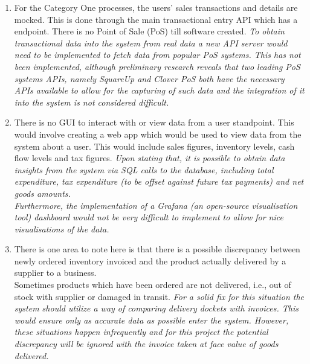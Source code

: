 \begin{enumerate}
	\item For the Category One processes, the users' sales transactions and details are mocked. This is done through the main transactional
	      entry API which has a  endpoint. There is no Point of Sale (PoS) till software created.
	      \bigbreak
	      \emph{To obtain transactional data into the system from real data a new API server would need to be
		      implemented to fetch data from popular PoS systems. This has not been implemented, although
		      preliminary research reveals that two leading PoS systems APIs, namely SquareUp\autocite{SquareSolutionsTools}
		      and Clover PoS \autocite{APIReferenceOverview} both have the necessary APIs available to
		      allow for the capturing of such data and the integration of it into the system is not considered difficult.}
	\item There is no GUI to interact with or view data from a user standpoint. This would involve creating a web app which would be used to view data from the system about a user. This
	      would include sales figures, inventory levels, cash flow levels and tax figures.
	      \bigbreak
	      \emph{Upon stating that,
		      it is possible to obtain data insights from the system via SQL calls to the database, including total expenditure,
		      tax expenditure (to be offset against future tax payments) and net goods amounts.\\
		      Furthermore, the implementation of a Grafana (an open-source visualisation tool) dashboard would not be very difficult to implement 
			  to allow for nice visualisations of the data.}
	\item There is one area to note here is that there is a possible discrepancy between newly ordered inventory invoiced and the product actually delivered
	      by a supplier to a business.\\
	      Sometimes products which have been ordered are not delivered, i.e., out of stock with supplier or damaged in transit.
	      \bigbreak
	      \emph{For a solid fix for this situation the system should utilize a way of comparing delivery dockets with invoices. This would ensure only as accurate data as
		      possible enter the system. However, these situations happen infrequently and for this project the potential discrepancy will be ignored with the invoice taken at
		      face value of goods delivered.}


\end{enumerate}
